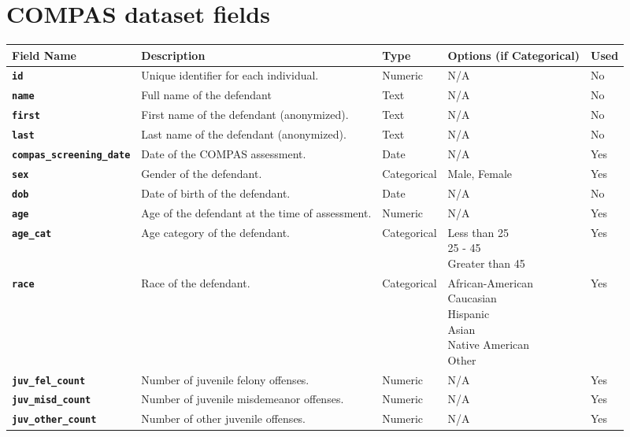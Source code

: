 \documentclass[conference]{IEEEtran}
\begin{document}
\onecolumn
\pagebreak
\appendix 
\section{COMPAS dataset fields}

	\begin{table}[!ht]
	\centering
	\begin{tabular}{|l|l|l|l|l|}
		\hline
		Field Name	&	Description	&	Type	&	Options (if Categorical)	&	Used \\ \hline\hline
		\textbf{\texttt{id}}	&	Unique identifier for each individual.	&	Numeric	&	N/A	&	No \\ \hline
		\textbf{\texttt{name}}	&	Full name of the defendant	&	Text	&	N/A	&	No \\ \hline
		\textbf{\texttt{first}}	&	First name of the defendant (anonymized).	&	Text	&	N/A	&	No \\ \hline
		\textbf{\texttt{last}}	&	Last name of the defendant (anonymized).	&	Text	&	N/A	&	No \\ \hline
		\textbf{\texttt{compas\_screening\_date}}	&	Date of the COMPAS assessment.	&	Date	&	N/A	&	Yes \\ \hline
		\textbf{\texttt{sex}}	&	Gender of the defendant.	&	Categorical	&	Male, Female	&	Yes \\ \hline
		\textbf{\texttt{dob}}	&	Date of birth of the defendant.	&	Date	&	N/A	&	No \\ \hline
		\textbf{\texttt{age}}	&	Age of the defendant at the time of assessment.	&	Numeric	&	N/A	&	Yes \\ \hline
		\textbf{\texttt{age\_cat}}	&	Age category of the defendant.	&	Categorical	&	\makecell[l]{Less than 25\\25 - 45\\Greater than 45}	&	Yes \\ \hline
		\textbf{\texttt{race}}	&	Race of the defendant.	&	Categorical	&	\makecell[l]{African-American\\Caucasian\\Hispanic\\Asian\\Native American\\Other}	&	Yes \\ \hline
		\textbf{\texttt{juv\_fel\_count}}	&	Number of juvenile felony offenses.	&	Numeric	&	N/A	&	Yes \\ \hline
		\textbf{\texttt{juv\_misd\_count}}	&	Number of juvenile misdemeanor offenses.	&	Numeric	&	N/A	&	Yes \\ \hline
		\textbf{\texttt{juv\_other\_count}}	&	Number of other juvenile offenses.	&	Numeric	&	N/A	&	Yes \\ \hline

\end{tabular}
\end{table}
\end{document}
